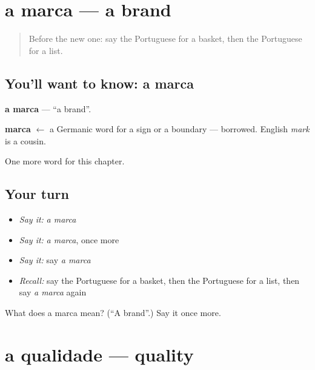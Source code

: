 \section[a marca]{a marca — a brand}

\label{lesson:PT-C167-marca}



\begin{quote}
Before the new one: say the Portuguese for a basket, then the Portuguese for a list.
\end{quote}

\subsection*{You'll want to know: a marca}
\textbf{a marca} — \textquotedblleft{}a brand\textquotedblright{}.

\begin{cousinweb}
\textbf{marca} $\leftarrow$ a Germanic word for a sign or a boundary — borrowed. English \emph{mark} is a cousin.
\end{cousinweb}

\begin{grammarlens}[title={What you've built}]
One more word for this chapter.
\end{grammarlens}

\subsection*{Your turn}
\begin{itemize}
\raggedright
  \item \emph{Say it:} \emph{a marca}
  \item \emph{Say it:} \emph{a marca}, once more
  \item \emph{Say it:} say \emph{a marca}
  \item \emph{Recall:} say the Portuguese for a basket, then the Portuguese for a list, then say \emph{a marca} again
\end{itemize}

\begin{tcolorbox}[breakable,colback=teal!4,colframe=teal!35!black,title={Before you move on}]
What does a marca mean? (\textquotedblleft{}A brand\textquotedblright{}.) Say it once more.
\end{tcolorbox}
\section[a qualidade]{a qualidade — quality}

